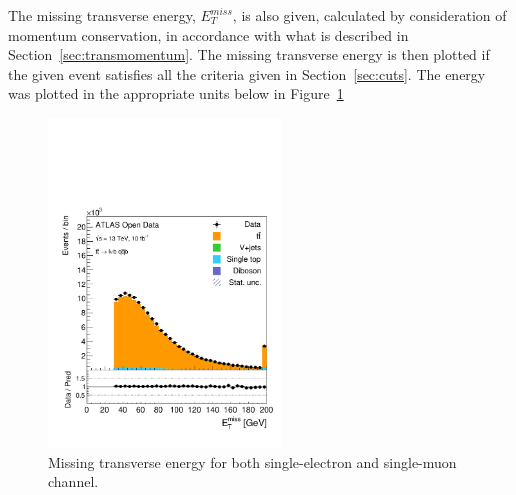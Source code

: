 \documentclass[12pt,a4paper]{article}
\numberwithin{equation}{section}
\begin{document}
The missing transverse energy, $E_T^{miss}$, is also given, calculated by
consideration of momentum conservation, in accordance with what is described in
Section~\ref{sec:transmomentum}. The missing transverse energy is then plotted
if the given event satisfies all the criteria given in Section~\ref{sec:cuts}.
The energy was plotted in the appropriate units below in Figure~\ref{fig:etmiss}
\begin{figure}[H]
  \centering
  \includegraphics[width=0.55\textwidth]{figures/hist_etmiss}
  \caption{\label{fig:etmiss}Missing transverse energy for both single-electron and single-muon channel.}
\end{figure}
\end{document}
